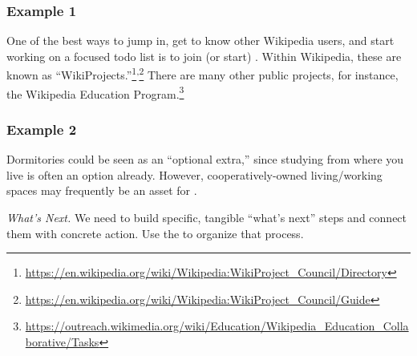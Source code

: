 \subsubsection*{Example 1}
One of the best ways to jump in, get to know other Wikipedia users,
and start working on a focused todo list is to join (or start)
.  Within Wikipedia, these are known
as
``WikiProjects.''\footnote{\url{https://en.wikipedia.org/wiki/Wikipedia:WikiProject_Council/Directory}}\textsuperscript{,}\footnote{\url{https://en.wikipedia.org/wiki/Wikipedia:WikiProject_Council/Guide}}
There are many other public projects, for instance, the Wikipedia
Education
Program.\footnote{\url{https://outreach.wikimedia.org/wiki/Education/Wikipedia_Education_Collaborative/Tasks}}

\subsubsection*{Example 2}
Dormitories could be seen as an ``optional extra,'' since studying
from where you live is often an option already.  However,
cooperatively-owned living/working spaces may frequently be an asset
for .


\begin{framed}
\noindent 
\emph{What's Next.}
We need to build specific, tangible ``what's next'' steps and connect them with concrete action. Use the  to organize that process. 
\end{framed}

